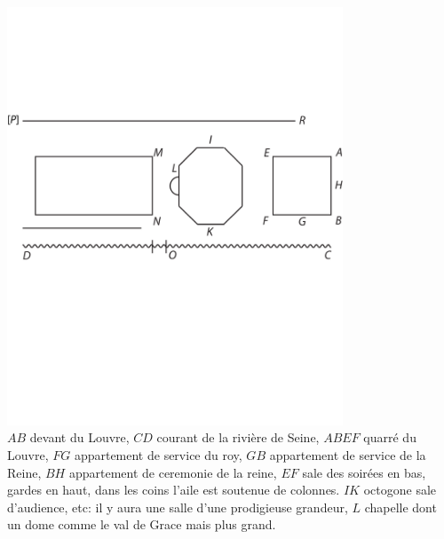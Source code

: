 \includegraphics[width=0.75\textwidth]{images/RK56900_235-d1.pdf}%
\\
%
\pend%
\vspace*{1em}%
\pstart%
$AB$ devant du Louvre\protect{}, $CD$ courant de la rivi\`{e}re de Seine\protect{}, $ABEF$ quarr\'{e} du Louvre\protect{}, $FG$ appartement de service du roy\protect{}, $GB$ appartement de service de la Reine, $BH$ appartement de ceremonie de la reine, $EF$ sale des soir\'{e}es en bas, gardes en haut, dans les coins l'aile est soutenue de colonnes. $IK$ octogone\protect{} sale d'audience\protect{}, etc: il y aura une salle d'une prodigieuse grandeur, $L$ chapelle\protect{} dont un dome comme le val de Grace mais plus grand.

